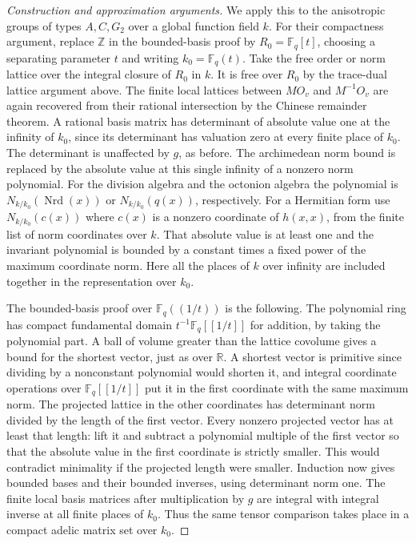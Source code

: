 \documentclass[11pt,a4paper,openany,oneside]{book}
\theoremstyle{resultstyle}
\theoremstyle{definition}
\numberwithin{equation}{chapter}
\begin{document}
\begin{proof}[Construction and approximation arguments]
We apply this to the anisotropic groups of types \(A,C,G_2\) over
a global function field \(k\). For their compactness
argument, replace \(\mathbb Z\) in the bounded-basis proof
by \(R_0=\mathbb F_q[t]\), choosing a separating
parameter \(t\) and writing \(k_0=\mathbb F_q(t)\).
Take the free order or norm lattice over the integral
closure of \(R_0\) in \(k\). It is free over \(R_0\)
by the trace-dual lattice argument above. The finite
local lattices between \(M O_v\) and \(M^{-1}O_v\)
are again recovered from their rational intersection
by the Chinese remainder theorem. A rational basis
matrix has determinant of absolute value one at
the infinity of \(k_0\), since its determinant has
valuation zero at every finite place of \(k_0\).
The determinant is unaffected by \(g\), as before.
The archimedean norm bound is replaced by the absolute
value at this single infinity of a nonzero norm polynomial.
For the division algebra and the octonion algebra the
polynomial is \(N_{k/k_0}(\operatorname{Nrd}(x))\) or
\(N_{k/k_0}(q(x))\), respectively. For a Hermitian form
use \(N_{k/k_0}(c(x))\) where \(c(x)\) is a nonzero
coordinate of \(h(x,x)\), from the finite list of norm
coordinates over \(k\).
That absolute value is at least one and the invariant
polynomial is bounded by a constant times a fixed
power of the maximum coordinate norm. Here all the
places of \(k\) over infinity are included together
in the representation over \(k_0\).

The bounded-basis proof over \(\mathbb F_q((1/t))\)
is the following. The polynomial ring has compact
fundamental domain \(t^{-1}\mathbb F_q[[1/t]]\)
for addition, by taking the polynomial part. A ball
of volume greater than the lattice covolume gives
a bound for the shortest vector, just as over
\(\mathbb R\). A shortest vector is primitive since
dividing by a nonconstant polynomial would shorten
it, and integral coordinate operations over
\(\mathbb F_q[[1/t]]\) put it in the first coordinate
with the same maximum norm. The projected lattice
in the other coordinates has determinant norm
divided by the length of the first vector.
Every nonzero projected vector has at least that
length: lift it and subtract a polynomial multiple
of the first vector so that the absolute value in
the first coordinate is strictly smaller. This
would contradict minimality if the projected length
were smaller. Induction now gives bounded bases and
their bounded inverses, using determinant norm one.
The finite local basis matrices after multiplication
by \(g\) are integral with integral inverse at all
finite places of \(k_0\). Thus the same tensor
comparison takes place in a compact adelic matrix set
over \(k_0\).


\end{proof}
\end{document}
